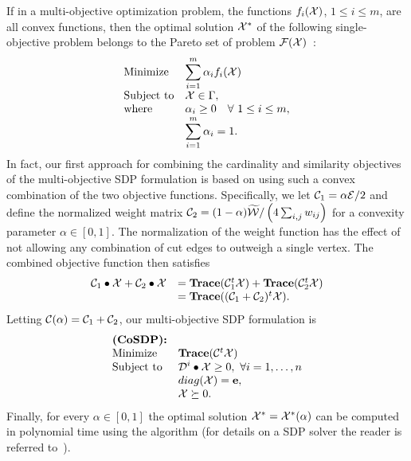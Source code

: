 \documentclass{ieee}
\def\C{{\cal C}}
\def\D{{\cal D}}
\def\E{{\cal E}}
\def\F{{\cal F}}
\def\W{{\cal W}}
\def\X{{\cal X}}
\def\e{{\bf e}}
\begin{document}
If in a multi-objective optimization problem, the functions
$f_i(\X)$, $1\le i\le m$, are all convex functions, then the optimal
solution $\X^*$ of the following single-objective problem  belongs to
the Pareto set of problem $\F(\X)$~\cite{nonlin-multiobj-opt}:
\begin{equation}
\label{eq:eq17}
\begin{array}{ll}
{\rm Minimize }& {\displaystyle \sum_{i=1}^m \alpha_i f_i(\X)} \\
{\rm Subject\ to} & {\displaystyle \X \in \Gamma}, \\
{\rm where} & {\displaystyle \alpha_i \ge 0 \quad \forall\ 1\le i\le m}, \\
                   & {\displaystyle \sum_{i=1}^m \alpha_i=1.}
\end{array}
\end{equation}
In fact, our first approach for combining the cardinality and
similarity objectives of the multi-objective SDP formulation is based
on using such a convex combination of the two objective functions.
Specifically, we let $\C_1=\alpha\E / 2$ and define the normalized
weight matrix $\C_2=(1-\alpha)\widetilde\W /\left (4\sum_{i,j}w_{ij}\right )$
for a convexity
parameter $\alpha\in [0,1]$. The normalization of the weight function has
the effect of not allowing any combination of cut edges to outweigh a
single vertex. The combined objective function then  satisfies
$$
\begin{array}{ll}
{\C_1 \bullet \X+\C_2 \bullet \X}&= \mathbf{Trace}(\C_1^t \X) + \mathbf{Trace}(\C_2^t \X) \\
&= \mathbf{Trace}((\C_1  + \C_2)^t \X).
\end{array}
$$
Letting $\C(\alpha)=\C_1+\C_2$, our multi-objective SDP formulation
is
$$
\begin{array}{ll}
{\textbf{(CoSDP):}}\\
{\rm Minimize}       & \mathbf{Trace}(\C^t \X)  \\
{\rm Subject\ to} & {\displaystyle \D^i \bullet \X \ge 0,\ \forall i=1, \ldots, n }  \\
                    & {\displaystyle  diag(\X )=\e},          \\
                    & {\displaystyle  \X \succeq 0}.
\end{array}
$$
Finally, for every $\alpha\in[0,1]$ the optimal solution
$\X^*=\X^*(\alpha)$ can be computed in polynomial time using the
algorithm \cite{ali-95} (for details on a SDP solver the reader is
referred to~\cite{toh99sdpt}).
\end{document}
